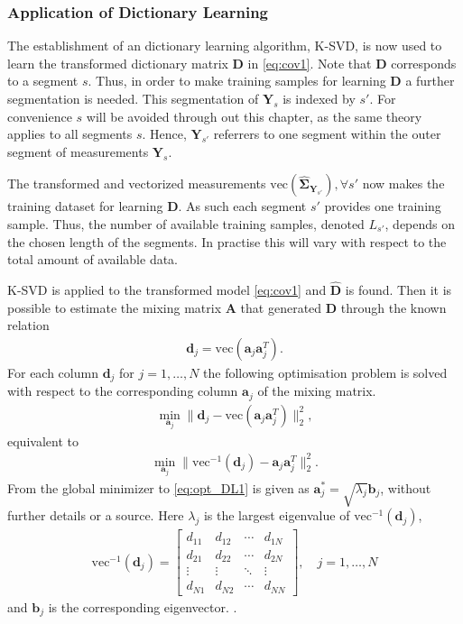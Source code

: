 \subsubsection{Application of Dictionary Learning}
The establishment of an dictionary learning algorithm, K-SVD, is now used to learn the transformed dictionary matrix $\mathbf{D}$ in \eqref{eq:cov1}. 
Note that $\mathbf{D}$ corresponds to a segment $s$. 
Thus, in order to make training samples for learning $\mathbf{D}$ a further segmentation is needed.
This segmentation of $\mathbf{Y}_s$ is indexed by $s'$. 
For convenience $s$ will be avoided through out this chapter, as the same theory applies to all segments $s$.
Hence, $\mathbf{Y}_{s'}$ referrers to one segment within the outer segment of measurements $\mathbf{Y}_s$. 
   
The transformed and vectorized measurements $\text{vec} \left( \widehat{\boldsymbol{\Sigma}}_{\mathbf{Y}_{s'}} \right), \forall s'$ now makes the training dataset for learning $\mathbf{D}$. 
As such each segment $s'$ provides one training sample.   
Thus, the number of available training samples, denoted $L_{s'}$, depends on the chosen length of the segments. In practise this will vary with respect to the total amount of available data. 

K-SVD is applied to the transformed model \eqref{eq:cov1} and $\hat{\mathbf{D}}$ is found. Then it is possible to estimate the mixing matrix $\mathbf{A}$ that generated $\mathbf{D}$ through the known relation 
\begin{align*}
\mathbf{d}_j = \text{vec}(\mathbf{a}_j \mathbf{a}_j^T).
\end{align*}
For each column $\mathbf{d}_j$ for $j = 1, \dots, N$ the following optimisation problem is solved with respect to the corresponding column $\mathbf{a}_j$ of the mixing matrix.
\begin{align*}
\min_{\mathbf{a}_j} \| \mathbf{d}_j -\text{vec}\left(\mathbf{a}_j \mathbf{a}_j^T\right) \|_2^2, 
\end{align*}
equivalent to 
\begin{align}
\min_{\mathbf{a}_j} \| \text{vec}^{-1}(\mathbf{d}_j) - \mathbf{a}_j \mathbf{a}_j^T\|_2^2. \label{eq:opt_DL1}
\end{align}
From \cite{Balkan2015} the global minimizer to \eqref{eq:opt_DL1} is given as $\mathbf{a}^{\ast}_j=\sqrt{\lambda_j} \mathbf{b}_j$, without further details or a source.  
Here $\lambda_j$ is the largest eigenvalue of $\text{vec}^{-1}(\mathbf{d}_j)$,
\begin{align*}
\text{vec}^{-1}(\mathbf{d}_j) = 
\begin{bmatrix}
d_{11} & d_{12} & \cdots & d_{1N} \\
d_{21} & d_{22} & \cdots & d_{2N} \\
\vdots & \vdots & \ddots & \vdots \\
d_{N1} & d_{N2} & \cdots & d_{NN}
\end{bmatrix}, \quad j =1, \dots, N
\end{align*}
and $\mathbf{b}_j$ is the corresponding eigenvector.
.

